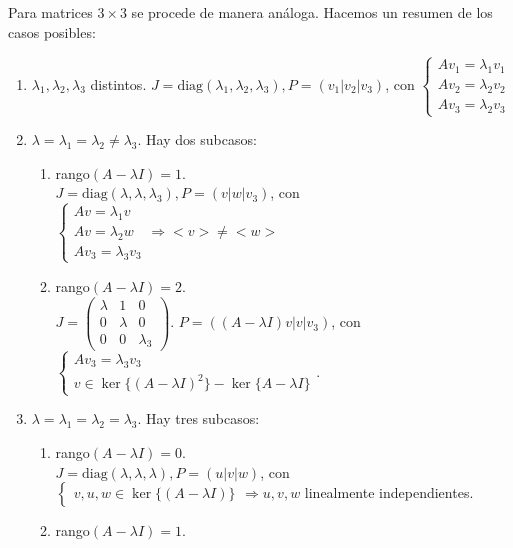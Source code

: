 \documentclass[11pt, a4paper,twoside]{article}
\theoremstyle{theorem-style}  %
\theoremstyle{definition-style}
\theoremstyle{example-style}
\begin{document}
Para matrices $ 3\times 3 $ se procede de manera análoga. Hacemos un resumen de los casos posibles:
\begin{enumerate}
	\item $ \lambda_1,\lambda_2,\lambda_3 $ distintos. $ J=\text{diag}(\lambda_1,\lambda_2,\lambda_3), P=(v_1|v_2|v_3) $, con $ \begin{cases}
	Av_1=\lambda_1v_1\\
	Av_2=\lambda_2v_2\\
	Av_3=\lambda_2v_3
	\end{cases} $
	\item $ \lambda= \lambda_1=\lambda_2\neq \lambda_3 $. Hay dos subcasos:
	\begin{enumerate}
		\item rango$ (A-\lambda I )= 1 $. \\
		$ J=\text{diag}(\lambda,\lambda,\lambda_3), P=(v|w|v_3) $, con $ \begin{cases}
		Av=\lambda_1v\\
		Av=\lambda_2w\\
		Av_3=\lambda_3v_3
		\end{cases}\Rightarrow <v>\neq <w> $
		\item rango$ (A-\lambda I )= 2 $. \\
		 $ J=\begin{pmatrix}
		\lambda &1 &0\\
		0 &\lambda &0\\
		0 &0 &\lambda_3
		\end{pmatrix} $. $ P=((A-\lambda I)v|v|v_3) $, con $ \begin{cases}
		Av_3=\lambda_3v_3\\
		v \in \ker\{(A-\lambda I)^2\}-\ker\{A-\lambda I\}
		\end{cases}$.
	\end{enumerate}
	\item $ \lambda= \lambda_1=\lambda_2= \lambda_3 $. Hay tres subcasos:
	\begin{enumerate}
		\item rango$ (A-\lambda I )= 0 $. \\
		$ J=\text{diag}(\lambda,\lambda,\lambda), P=(u|v|w) $, con $ \begin{cases}
		v,u,w \in \ker\{(A-\lambda I)\}
		\end{cases}\Rightarrow u,v,w $ linealmente independientes.
		\item rango$ (A-\lambda I )= 1 $. \\

\end{enumerate}
\end{enumerate}
\end{document}
